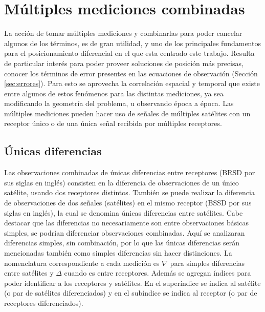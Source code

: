 \documentclass[a4paper,12pt,oneside,onecolumn,final,openright]{book}%
\begin{document}
\section{Múltiples mediciones combinadas}
	La acción de tomar múltiples mediciones y combinarlas para poder cancelar algunos de los términos, es de gran utilidad, y uno de los principales fundamentos para el posicionamiento diferencial en el que esta centrado este trabajo. Resulta de particular interés para poder proveer soluciones de posición más precisas, conocer los términos de error presentes en las ecuaciones de observación (Sección \ref{sec:errores}). Para esto se aprovecha la correlación espacial y temporal que existe entre algunos de estos fenómenos para las distintas mediciones, ya sea modificando la geometría del problema, u observando época a época. Las múltiples mediciones pueden hacer uso de señales de múltiples satélites con un receptor único o de una única señal recibida por múltiples receptores.
\subsection{Únicas diferencias}\label{sec:SD}
	Las observaciones combinadas de únicas diferencias entre receptores (BRSD por sus siglas en inglés) consisten en la diferencia de observaciones de un único satélite, usando dos receptores distintos. También se puede realizar la diferencia de observaciones de dos señales (satélites) en el mismo receptor (BSSD por sus siglas en inglés), la cual se denomina únicas diferencias entre satélites. Cabe destacar que las diferencias no necesariamente son entre observaciones básicas simples, se podrían diferenciar observaciones combinadas. Aquí se analizaran diferencias simples, sin combinación, por lo que las únicas diferencias serán mencionadas también como simples diferencias sin hacer distinciones.
	La nomenclatura correspondiente a cada medición es $\nabla$ para simples diferencias entre satélites y $\Delta$ cuando es entre receptores. Además se agregan índices para poder identificar a los receptores y satélites. En el superíndice se indica al satélite (o par de satélites diferenciados) y en el subíndice se indica al receptor (o par de receptores diferenciados).
\end{document}
